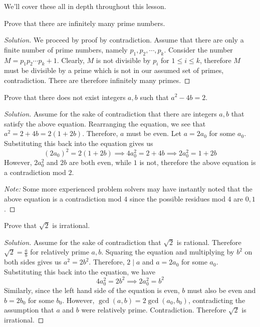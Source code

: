 \documentclass[12pt,openany]{book}
\theoremstyle{definition}
\newenvironment{soln}{\begin{proof}[Solution]}{\end{proof}}
\theoremstyle{definition}
\begin{document}
We'll cover these all in depth throughout this lesson.

\begin{exmp}  Prove that there are infinitely many prime numbers. \end{exmp}
\begin{soln}  We proceed by proof by contradiction.  Assume that there are only a finite number of prime numbers, namely $p_1, p_2, \cdots, p_k$.  Consider the number $M=p_1p_2\cdots p_k+1$.  Clearly, $M$ is not divisible by $p_i$ for $1\le i\le k$, therefore $M$ must be divisible by a prime which is not in our assumed set of primes, contradiction.  There are therefore infinitely many primes.  \end{soln}

\begin{exmp}  Prove that there does not exist integers $a,b$ such that $a^2-4b=2$.  \end{exmp}
\begin{soln}  Assume for the sake of contradiction that there are integers $a,b$ that satisfy the above equation.  Rearranging the equation, we see that $a^2=2+4b=2(1+2b)$.  Therefore, $a$ must be even.  Let $a=2a_0$ for some $a_0$.  Substituting this back into the equation gives us $$(2a_0)^2=2(1+2b)\implies 4a_0^2=2+4b\implies 2a_0^2=1+2b$$
However, $2a_0^2$ and $2b$ are both even, while $1$ is not, therefore the above equation is a contradiction mod $2$.  

\textit{Note:}  Some more experienced problem solvers may have instantly noted that the above equation is a contradiction mod $4$ since the possible residues mod $4$ are $0,1$.  
\end{soln}

\begin{exmp}  Prove that $\sqrt{2}$ is irrational.  \end{exmp}
\begin{soln}  Assume for the sake of contradiction that $\sqrt{2}$ is rational.  Therefore $\sqrt{2}=\frac{a}{b}$ for relatively prime $a,b$.  Squaring the equation and multiplying by $b^2$ on both sides gives us $a^2=2b^2$.  Therefore, $2\mid a$ and $a=2a_0$ for some $a_0$.  Substituting this back into the equation, we have $$4a_0^2=2b^2\implies 2a_0^2=b^2$$  Similarly, since the left hand side of the equation is even, $b$ must also be even and $b=2b_0$ for some $b_0$.  However, $\gcd(a,b)=2\gcd(a_0, b_0)$, contradicting the assumption that $a$ and $b$ were relatively prime.  Contradiction.  Therefore $\sqrt{2}$ is irrational.  \end{soln}
\end{document}
